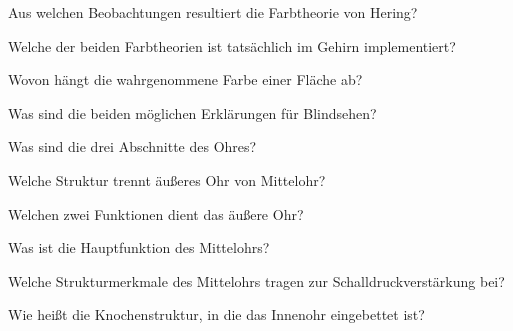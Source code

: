 \documentclass[10pt, a4paper]{exam}
\begin{document}
\begin{questions}
  \question Aus welchen Beobachtungen resultiert die Farbtheorie von Hering?
  \begin{solution}

  \end{solution}

  \question Welche der beiden Farbtheorien ist tatsächlich im Gehirn implementiert?
  \begin{solution}

  \end{solution}

  \question Wovon hängt die wahrgenommene Farbe einer Fläche ab?
  \begin{solution}

  \end{solution}

  \question Was sind die beiden möglichen Erklärungen für Blindsehen?
  \begin{solution}

  \end{solution}

  \question Was sind die drei Abschnitte des Ohres?
  \begin{solution}

  \end{solution}

  \question Welche Struktur trennt äußeres Ohr von Mittelohr?
  \begin{solution}

  \end{solution}

  \question Welchen zwei Funktionen dient das äußere Ohr?
  \begin{solution}

  \end{solution}

  \question Was ist die Hauptfunktion des Mittelohrs?
  \begin{solution}

  \end{solution}

  \question Welche Strukturmerkmale des Mittelohrs tragen zur Schalldruckverstärkung bei?
  \begin{solution}

  \end{solution}

  \question Wie heißt die Knochenstruktur, in die das Innenohr eingebettet ist?
  \begin{solution}

  \end{solution}


\end{questions}
\end{document}
